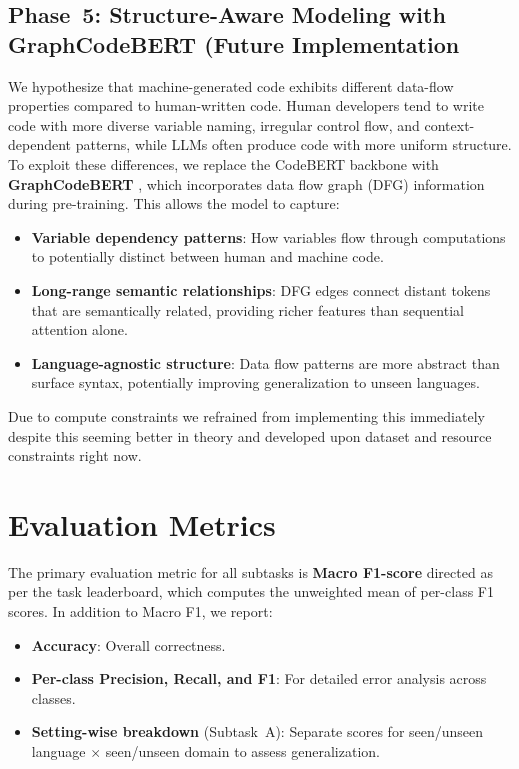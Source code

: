 \documentclass[11pt]{article}
\begin{document}
\subsection{Phase~5: Structure-Aware Modeling with GraphCodeBERT (Future Implementation}
We hypothesize that machine-generated code exhibits different data-flow properties compared to human-written code. Human developers tend to write code with more diverse variable naming, irregular control flow, and context-dependent patterns, while LLMs often produce code with more uniform structure.
To exploit these differences, we replace the CodeBERT backbone with \textbf{GraphCodeBERT} \cite{guo2021graphcodebert}, which incorporates data flow graph (DFG) information during pre-training. This allows the model to capture:
\begin{itemize}
    \item \textbf{Variable dependency patterns}: How variables flow through computations to potentially distinct between human and machine code.
    \item \textbf{Long-range semantic relationships}: DFG edges connect distant tokens that are semantically related, providing richer features than sequential attention alone.
    \item \textbf{Language-agnostic structure}: Data flow patterns are more abstract than surface syntax, potentially improving generalization to unseen languages.
\end{itemize}
Due to compute constraints we refrained from implementing this immediately despite this seeming better in theory and developed upon dataset and resource constraints right now.
\section{Evaluation Metrics}
\label{sec:metrics}

The primary evaluation metric for all subtasks is \textbf{Macro F1-score} directed as per the task leaderboard, which computes the unweighted mean of per-class F1 scores.
In addition to Macro F1, we report:
\begin{itemize}
    \item \textbf{Accuracy}: Overall correctness.
    \item \textbf{Per-class Precision, Recall, and F1}: For detailed error analysis across classes.
    \item \textbf{Setting-wise breakdown} (Subtask~A): Separate scores for seen/unseen language $\times$ seen/unseen domain to assess generalization.
\end{itemize}
\end{document}
